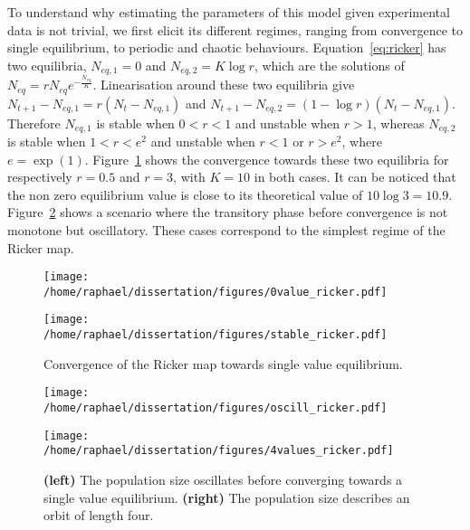 \documentclass[12pt]{article}
\begin{document}
	To understand why estimating the parameters of this model given experimental data is not trivial, we first elicit its different regimes, ranging from convergence to single equilibrium, to periodic and  chaotic behaviours. Equation~\ref{eq:ricker} has two equilibria, $N_{eq, 1} = 0$ and $N_{eq, 2} = K\log r$, which are the solutions of  $N_{eq} = r N_{eq} e^{-\frac{N_{eq}}{K}}$. Linearisation around these two equilibria give $N_{t+1} - N_{eq, 1} = r(N_{t} - N_{eq, 1})$ and $N_{t+1} - N_{eq, 2} = (1-\log r)(N_{t} - N_{eq, 1})$. Therefore $N_{eq, 1}$ is stable when $0 < r < 1$ and unstable when $r > 1$, whereas $N_{eq, 2}$ is stable when $1 < r < e^2$ and unstable when $r < 1$ or $r > e^2$, where $e=\exp(1)$. Figure~\ref{fig:stab} shows the convergence towards these two equilibria for respectively $r=0.5$ and $r=3$, with $K=10$ in both cases. It can be noticed that the non zero equilibrium value is close to its theoretical value of $10 \log 3 = 10.9$.  Figure~\ref{fig:oscill} shows a scenario where the transitory phase before convergence is not monotone but oscillatory. These cases correspond to the simplest regime of the Ricker map.

	\begin{figure}[htb]
		\centering
		\vspace{5mm}
		\begin{minipage}{0.49\textwidth}
			\centering
			\texttt{[image: /home/raphael/dissertation/figures/0value\_ricker.pdf]}
		\end{minipage}
		\begin{minipage}{0.49\textwidth}
			\centering
			\texttt{[image: /home/raphael/dissertation/figures/stable\_ricker.pdf]}
		\end{minipage}
		\caption{Convergence of the Ricker map towards single value equilibrium.}
		\vspace{5mm}
		\label{fig:stab}
	\end{figure}
	
	\begin{figure}[htb]
		\centering
		\vspace{5mm}
		\begin{minipage}{0.49\textwidth}
			\centering
			\texttt{[image: /home/raphael/dissertation/figures/oscill\_ricker.pdf]}
		\end{minipage}
		\begin{minipage}{0.49\textwidth}
			\centering
			\texttt{[image: /home/raphael/dissertation/figures/4values\_ricker.pdf]}
		\end{minipage}
		\caption[Examples of oscillation and orbit of the Ricker map.]{\textbf{(left)} The population size oscillates before converging towards a single value equilibrium. \textbf{(right)} The population size describes an orbit of length four.}
		\vspace{5mm}
		\label{fig:oscill}
	\end{figure}
	
\end{document}
